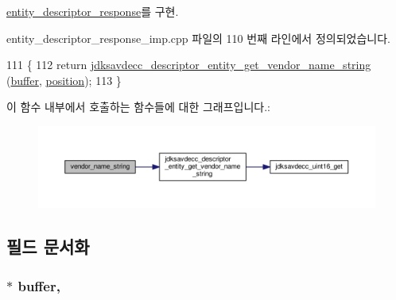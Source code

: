 \hyperlink{classavdecc__lib_1_1entity__descriptor__response_a435b2f9c9f69b0abebda21b3ef347697}{entity\+\_\+descriptor\+\_\+response}를 구현.



entity\+\_\+descriptor\+\_\+response\+\_\+imp.\+cpp 파일의 110 번째 라인에서 정의되었습니다.


\begin{DoxyCode}
111 \{
112     \textcolor{keywordflow}{return} \hyperlink{group__descriptor__entity_ga397d7c53568d8b606ba5342461faa252}{jdksavdecc\_descriptor\_entity\_get\_vendor\_name\_string}
      (\hyperlink{classavdecc__lib_1_1descriptor__response__base__imp_a56ed84df35de10bdb65e72b184309497}{buffer}, \hyperlink{classavdecc__lib_1_1descriptor__response__base__imp_a7a04afe5347934be732ec70a70bd0a28}{position});
113 \}
\end{DoxyCode}


이 함수 내부에서 호출하는 함수들에 대한 그래프입니다.\+:
\nopagebreak
\begin{figure}[H]
\begin{center}
\leavevmode
\includegraphics[width=350pt]{classavdecc__lib_1_1entity__descriptor__response__imp_aad57a8a03f37d9edf5c565eb492435c2_cgraph}
\end{center}
\end{figure}




\subsection{필드 문서화}
\subsubsection[{\texorpdfstring{buffer}{buffer}}]{$\ast$ buffer\hspace{0.3cm}{\ttfamily [protected]}, {\ttfamily [inherited]}}\hypertarget{classavdecc__lib_1_1descriptor__response__base__imp_a56ed84df35de10bdb65e72b184309497}{}\label{classavdecc__lib_1_1descriptor__response__base__imp_a56ed84df35de10bdb65e72b184309497}


